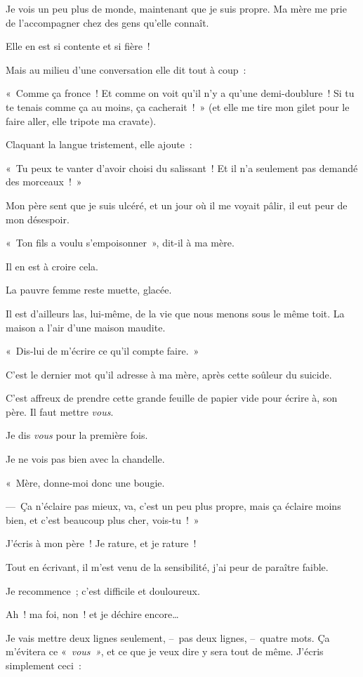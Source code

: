 \documentclass[french,twoside]{book} %
\begin{document}
\bigbreak
\noindent Je vois un peu plus de monde, maintenant que je suis propre. Ma mère me prie de l’accompagner chez des gens qu’elle connaît.\par
Elle en est si contente et si fière !\par
Mais au milieu d’une conversation elle dit tout à coup :\par
« Comme ça fronce ! Et comme on voit qu’il n’y a qu’une demi-doublure ! Si tu te tenais comme ça au moins, ça cacherait ! » (et elle me tire mon gilet pour le faire aller, elle tripote ma cravate).\par
Claquant la langue tristement, elle ajoute :\par
« Tu peux te vanter d’avoir choisi du salissant ! Et il n’a seulement pas demandé des morceaux ! »\par
\bigbreak
\noindent Mon père sent que je suis ulcéré, et un jour où il me voyait pâlir, il eut peur de mon désespoir.\par
« Ton fils a voulu s’empoisonner », dit-il à ma mère.\par
Il en est à croire cela.\par
La pauvre femme reste muette, glacée.\par
Il est d’ailleurs las, lui-même, de la vie que nous menons sous le même toit. La maison a l’air d’une maison maudite.\par
\bigbreak
\noindent « Dis-lui de m’écrire ce qu’il compte faire. »\par
C’est le dernier mot qu’il adresse à ma mère, après cette soûleur du suicide.\par
\bigbreak
\noindent C’est affreux de prendre cette grande feuille de papier vide pour écrire à, son père. Il faut mettre \emph{vous}.\par
Je dis \emph{vous} pour la première fois.\par
Je ne vois pas bien avec la chandelle.\par
« Mère, donne-moi donc une bougie.\par
— Ça n’éclaire pas mieux, va, c’est un peu plus propre, mais ça éclaire moins bien, et c’est beaucoup plus cher, vois-tu ! »\par
J’écris à mon père ! Je rature, et je rature !\par
Tout en écrivant, il m’est venu de la sensibilité, j’ai peur de paraître faible.\par
Je recommence ; c’est difficile et douloureux.\par
Ah ! ma foi, non ! et je déchire encore…\par
Je vais mettre deux lignes seulement, – pas deux lignes, – quatre mots. Ça m’évitera ce « \emph{vous »}, et ce que je veux dire y sera tout de même. J’écris simplement ceci :\par
\end{document}

